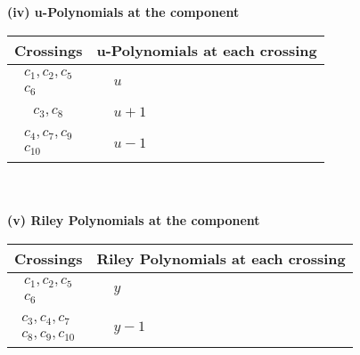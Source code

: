 \documentclass[1p]{elsarticle_modified}
\theoremstyle{definition}
\begin{document}
\newpage\renewcommand{\arraystretch}{1}
\flushleft \textbf{(iv) u-Polynomials at the component}\newline \\
\begin{tabular}{m{50pt}|m{274pt}}
Crossings & \hspace{64pt}u-Polynomials at each crossing \\
\hline $$\begin{aligned}c_{1},c_{2},c_{5}\\c_{6}\end{aligned}$$&$\begin{aligned}
&u
\end{aligned}$\\
\hline $$\begin{aligned}c_{3},c_{8}\end{aligned}$$&$\begin{aligned}
&u+1
\end{aligned}$\\
\hline $$\begin{aligned}c_{4},c_{7},c_{9}\\c_{10}\end{aligned}$$&$\begin{aligned}
&u-1
\end{aligned}$\\
\hline
\end{tabular}\\~\\
\newpage\renewcommand{\arraystretch}{1}
\flushleft \textbf{(v) Riley Polynomials at the component}\newline \\
\begin{tabular}{m{50pt}|m{274pt}}
Crossings & \hspace{64pt}Riley Polynomials at each crossing \\
\hline $$\begin{aligned}c_{1},c_{2},c_{5}\\c_{6}\end{aligned}$$&$\begin{aligned}
&y
\end{aligned}$\\
\hline $$\begin{aligned}c_{3},c_{4},c_{7}\\c_{8},c_{9},c_{10}\end{aligned}$$&$\begin{aligned}
&y-1
\end{aligned}$\\
\hline
\end{tabular}\\~\\
\end{document}
